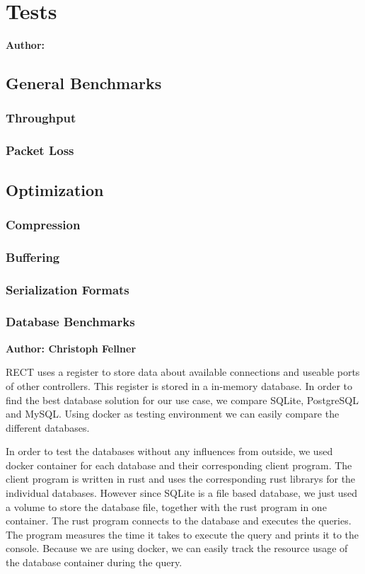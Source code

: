 \chapter{Tests}

\textbf{Author: }

\section{General Benchmarks}
\subsection{Throughput}
\subsection{Packet Loss}

\section{Optimization}
\subsection{Compression}
\subsection{Buffering}
\subsection{Serialization Formats}

\subsection{Database Benchmarks}
\textbf{Author: Christoph Fellner}

RECT uses a register to store data about available connections and useable ports of other controllers. This register is stored in a in-memory database. In order to find the 
best database solution for our use case, we compare SQLite, PostgreSQL and MySQL. Using docker as testing environment we can easily compare the different databases.\newline

In order to test the databases without any influences from outside, we used docker container for each database and their corresponding client program. The client program
is written in rust and uses the corresponding rust librarys for the individual databases. However since SQLite is a file based database, we just used a volume to store the
database file, together with the rust program in one container. The rust program connects to the database and executes the queries. The program measures the time it 
takes to execute the query and prints it to the console. Because we are using docker, we can easily track the resource usage of the database container during the query.\newline

